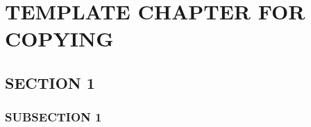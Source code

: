 \documentclass[../wifi-security.tex]{subfiles}
\begin{document}
\chapter{TEMPLATE CHAPTER FOR COPYING}




\section{SECTION 1}




\subsection{SUBSECTION 1}



\end{document}

